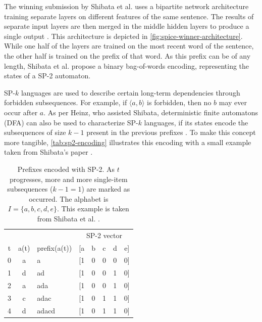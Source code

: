 The winning submission by Shibata et al. uses a bipartite network architecture training separate layers on different features of the same sentence. The results of separate input layers are then merged in the middle hidden layers to produce a single output \cite{shibata2016bipartite}. This architecture is depicted in \autoref{fig:spice-winner-architecture}.
While one half of the layers are trained on the most recent word of the sentence, the other half is trained on the prefix of that word. As this prefix can be of any length, Shibata et al. propose a binary bag-of-words encoding, representing the states of a SP-2 automaton.

SP-$k$ languages are used to describe certain long-term dependencies through forbidden subsequences. For example, if $\langle a,b \rangle$ is forbidden, then no $b$ may ever occur after $a$. As per Heinz, who assisted Shibata, deterministic finite automatons (DFA) can also be used to characterize SP-$k$ languages, if its states encode the subsequences of size $k-1$  present in the previous prefixes \cite{heinz2010estimatingSP}. To make this concept more tangible, \autoref{tab:sp2-encoding} illustrates this encoding with a small example taken from Shibata's paper \cite{shibata2016bipartite}.\\

\begin{table}
    \centering
    \begin{tabular}{cclccccc}
        \hline
          &      &              & \multicolumn{5}{c}{SP-2 vector}\\
        t & a(t) & prefix(a(t)) & [a & b & c & d & e]\\
        \hline
        0 & a    & a            & [1 & 0 & 0 & 0 & 0]\\
        1 & d    & ad           & [1 & 0 & 0 & 1 & 0]\\
        2 & a    & ada          & [1 & 0 & 0 & 1 & 0]\\
        3 & c    & adac         & [1 & 0 & 1 & 1 & 0]\\
        4 & d    & adacd        & [1 & 0 & 1 & 1 & 0]\\
        \hline
    \end{tabular}
    \caption{Prefixes encoded with SP-2. As $t$ progresses, more and more single-item subsequences ($k-1=1$) are marked as occurred. The alphabet is $I=\{a,b,c,d,e\}$. This example is taken from Shibata et al.  \cite{shibata2016bipartite}.}
    \label{tab:sp2-encoding}
\end{table}

